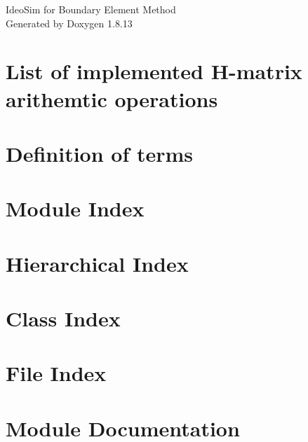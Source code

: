 \documentclass[twoside]{book}
\newcommand{\+}{\discretionary{\mbox{\scriptsize$\hookleftarrow$}}{}{}}
\newcommand{\clearemptydoublepage}{%
  \newpage{\pagestyle{empty}\cleardoublepage}%
}
\begin{document}
\hypersetup{pageanchor=false,
             bookmarksnumbered=true,
             pdfencoding=unicode
            }
\begin{titlepage}
\vspace*{7cm}
\begin{center}%
{\Large IdeoSim for Boundary Element Method}\\
\vspace*{1cm}
{\large Generated by Doxygen 1.8.13}\\
\end{center}
\end{titlepage}
\clearemptydoublepage
{}
\tableofcontents
\clearemptydoublepage
{}
\hypersetup{pageanchor=true}

\chapter{List of implemented H-\/matrix arithemtic operations}
\label{md_hackbusch-h-matrix-implementation}

\chapter{Definition of terms}
\label{md_term-definitions}

\chapter{Module Index}

\chapter{Hierarchical Index}

\chapter{Class Index}

\chapter{File Index}

\chapter{Module Documentation}








\end{document}
